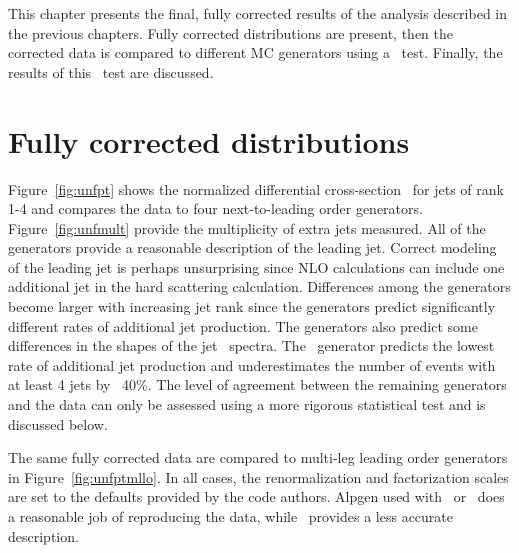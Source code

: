 
This chapter presents the final, fully corrected results of the analysis described in the previous chapters. Fully corrected distributions are present, then the corrected data is compared to different MC generators using a \chisq\ test. Finally, the results of this \chisq\ test are discussed.
\section{Fully corrected distributions}
Figure~\ref{fig:unfpt} shows the normalized differential cross-section \sigmapti\ for jets of rank 1-4 and compares the data to 
four next-to-leading order generators.  Figure~\ref{fig:unfmult} provide the multiplicity of extra jets measured.
All of the generators provide a reasonable description of the leading jet. 
Correct modeling of the leading jet is perhaps unsurprising since NLO calculations can include one additional jet in the hard scattering calculation. 
Differences among the generators become larger with increasing jet rank since the generators predict significantly different rates of additional jet production. 
The generators also predict some differences in the shapes of the jet \pt\ spectra.
The \mcnlohw\ generator predicts the lowest rate of additional jet production and underestimates the number of events with at least 4 jets by ~40\%.
The level of agreement between the remaining generators and the data can only be assessed using a more rigorous statistical test and is discussed below.


The same fully corrected data are compared to multi-leg leading order generators in Figure~\ref{fig:unfptmllo}.  In all cases, the renormalization and
factorization scales are set to the defaults provided by the code authors.  Alpgen used with \py\ or \hw\ does a reasonable job of reproducing the data, while \madpy\ provides a less accurate description.

